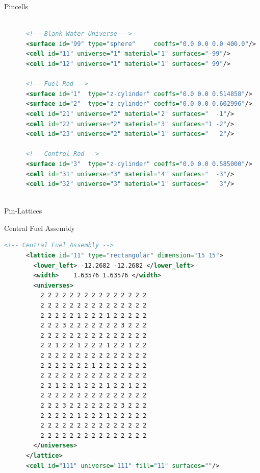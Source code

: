 \begin{frame}[fragile]{Pincells}

  \begin{scriptsize}
    \begin{lstlisting}[language=XML,gobble=4]
      
      <!-- Blank Water Universe -->
      <surface id="99" type="sphere"     coeffs="0.0 0.0 0.0 400.0"/>   <!-- dummy -->
      <cell id="11" universe="1" material="1" surfaces="-99"/>
      <cell id="12" universe="1" material="1" surfaces=" 99"/>

      <!-- Fuel Rod -->
      <surface id="1"  type="z-cylinder" coeffs="0.0 0.0 0.514858"/>    <!-- fuel OR      -->
      <surface id="2"  type="z-cylinder" coeffs="0.0 0.0 0.602996"/>    <!-- fuel clad OR -->
      <cell id="21" universe="2" material="2" surfaces="  -1"/>         <!-- fuel  -->
      <cell id="22" universe="2" material="3" surfaces="1 -2"/>         <!-- clad  -->
      <cell id="23" universe="2" material="1" surfaces="   2"/>         <!-- water -->

      <!-- Control Rod -->
      <surface id="3"  type="z-cylinder" coeffs="0.0 0.0 0.585000"/>    <!-- pyrex OR -->
      <cell id="31" universe="3" material="4" surfaces="  -3"/>         <!-- pyrex -->
      <cell id="32" universe="3" material="1" surfaces="   3"/>         <!-- water -->
      
    \end{lstlisting}
  \end{scriptsize}

    
\end{frame}


\begin{frame}[fragile]{Pin-Lattices}

  \centering

  Central Fuel Assembly

  \begin{scriptsize}
    \begin{lstlisting}[language=XML,gobble=4]
      <!-- Central Fuel Assembly -->      
      <lattice id="11" type="rectangular" dimension="15 15">
        <lower_left> -12.2682 -12.2682 </lower_left>
        <width>    1.63576 1.63576 </width>
        <universes>
          2 2 2 2 2 2 2 2 2 2 2 2 2 2 2
          2 2 2 2 2 2 2 2 2 2 2 2 2 2 2
          2 2 2 2 2 1 2 2 2 1 2 2 2 2 2
          2 2 2 3 2 2 2 2 2 2 2 3 2 2 2
          2 2 2 2 2 2 2 2 2 2 2 2 2 2 2
          2 2 1 2 2 1 2 2 2 1 2 2 1 2 2
          2 2 2 2 2 2 2 2 2 2 2 2 2 2 2
          2 2 2 2 2 2 2 1 2 2 2 2 2 2 2
          2 2 2 2 2 2 2 2 2 2 2 2 2 2 2
          2 2 1 2 2 1 2 2 2 1 2 2 1 2 2
          2 2 2 2 2 2 2 2 2 2 2 2 2 2 2
          2 2 2 3 2 2 2 2 2 2 2 3 2 2 2
          2 2 2 2 2 1 2 2 2 1 2 2 2 2 2
          2 2 2 2 2 2 2 2 2 2 2 2 2 2 2
          2 2 2 2 2 2 2 2 2 2 2 2 2 2 2
        </universes>
      </lattice>
      <cell id="111" universe="111" fill="11" surfaces=""/>
    \end{lstlisting}
  \end{scriptsize}
  
\end{frame}

